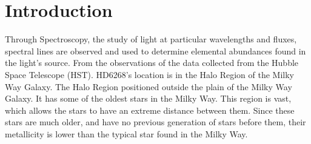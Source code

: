 \section{Introduction}
Through Spectroscopy, the study of light at particular wavelengths and fluxes, spectral lines are observed and used to determine elemental abundances found in the light's source. From the observations of the data collected from the Hubble Space Telescope (HST). HD6268's location is in the Halo Region of the Milky Way Galaxy. The Halo Region positioned outside the plain of the Milky Way Galaxy. It has some of the oldest stars in the Milky Way. This region is vast, which allows the stars to have an extreme distance between them. Since these stars are much older, and have no previous generation of stars before them, their metallicity is lower than the typical star found in the Milky Way.
